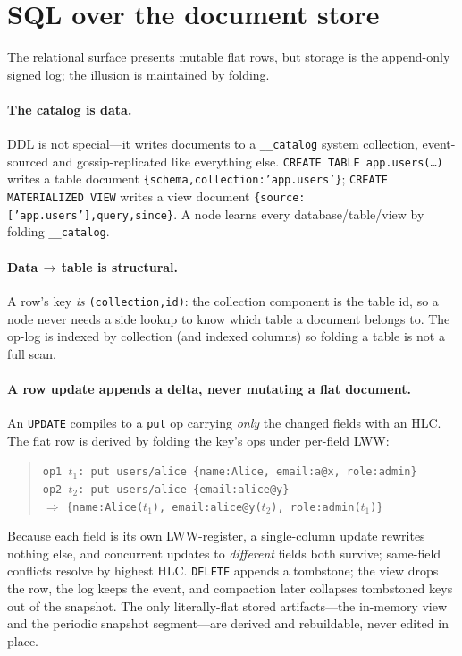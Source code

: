 \documentclass[10pt,twocolumn]{article}
\newcommand{\code}[1]{\texttt{\small #1}}
\newcommand{\hlc}[1]{\ensuremath{t_{#1}}}
\begin{document}
\section{SQL over the document store}
The relational surface presents mutable flat rows, but storage is the append-only
signed log; the illusion is maintained by folding.

\paragraph{The catalog is data.} DDL is not special---it writes documents to a
\code{\_\_catalog} system collection, event-sourced and gossip-replicated like
everything else. \code{CREATE TABLE app.users(\dots)} writes a table document
\code{\{schema,collection:'app.users'\}}; \code{CREATE MATERIALIZED VIEW} writes a
view document \code{\{source:['app.users'],query,since\}}. A node learns every
database/table/view by folding \code{\_\_catalog}.

\paragraph{Data\,$\to$\,table is structural.} A row's key \emph{is}
\code{(collection,id)}: the collection component is the table id, so a node never
needs a side lookup to know which table a document belongs to. The op-log is indexed
by collection (and indexed columns) so folding a table is not a full scan.

\paragraph{A row update appends a delta, never mutating a flat document.} An
\code{UPDATE} compiles to a \code{put} op carrying \emph{only} the changed fields with
an HLC. The flat row is derived by folding the key's ops under per-field LWW:
\begin{quote}\footnotesize
\code{op1 \hlc1: put users/alice \{name:Alice, email:a@x, role:admin\}}\\
\code{op2 \hlc2: put users/alice \{email:alice@y\}}\\
$\Rightarrow$ \code{\{name:Alice(\hlc1), email:alice@y(\hlc2), role:admin(\hlc1)\}}
\end{quote}
Because each field is its own LWW-register, a single-column update rewrites nothing
else, and concurrent updates to \emph{different} fields both survive; same-field
conflicts resolve by highest HLC. \code{DELETE} appends a tombstone; the view drops
the row, the log keeps the event, and compaction later collapses tombstoned keys out
of the snapshot. The only literally-flat stored artifacts---the in-memory view and
the periodic snapshot segment---are derived and rebuildable, never edited in place.
\end{document}
